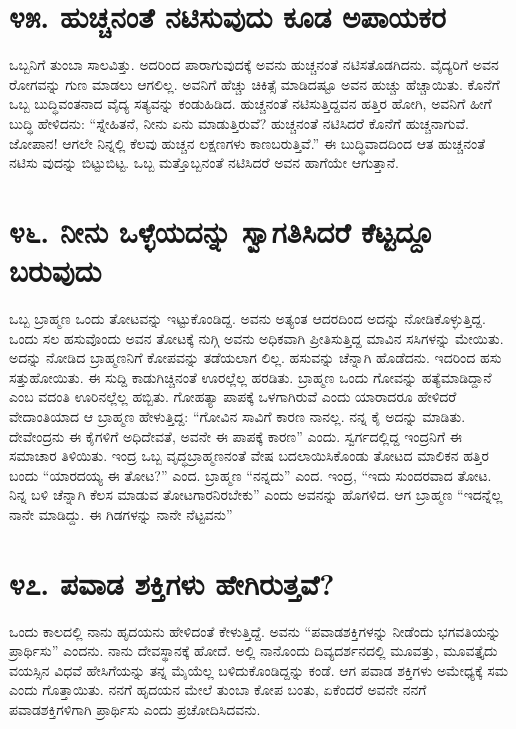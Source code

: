 \section{\num{೪೫. } ಹುಚ್ಚನಂತೆ ನಟಿಸುವುದು ಕೂಡ ಅಪಾಯಕರ}

ಒಬ್ಬನಿಗೆ ತುಂಬಾ ಸಾಲವಿತ್ತು. ಅದರಿಂದ ಪಾರಾಗುವುದಕ್ಕೆ ಅವನು ಹುಚ್ಚನಂತೆ ನಟಿಸತೊಡಗಿದನು. ವೈದ್ಯರಿಗೆ ಅವನ ರೋಗವನ್ನು ಗುಣ ಮಾಡಲು ಆಗಲಿಲ್ಲ. ಅವನಿಗೆ ಹೆಚ್ಚು ಚಿಕಿತ್ಸೆ ಮಾಡಿದಷ್ಟೂ ಅವನ ಹುಚ್ಚು ಹೆಚ್ಚಾಯಿತು. ಕೊನೆಗೆ ಒಬ್ಬ ಬುದ್ಧಿವಂತನಾದ ವೈದ್ಯ ಸತ್ಯವನ್ನು ಕಂಡುಹಿಡಿದ. ಹುಚ್ಚನಂತೆ ನಟಿಸುತ್ತಿದ್ದವನ ಹತ್ತಿರ ಹೋಗಿ, ಅವನಿಗೆ ಹೀಗೆ ಬುದ್ಧಿ ಹೇಳಿದನು: “ಸ್ನೇಹಿತನೆ, ನೀನು ಏನು ಮಾಡುತ್ತಿರುವೆ? ಹುಚ್ಚನಂತೆ ನಟಿಸಿದರೆ ಕೊನೆಗೆ ಹುಚ್ಚನಾಗುವೆ. ಜೋಪಾನ! ಆಗಲೇ ನಿನ್ನಲ್ಲಿ ಕೆಲವು ಹುಚ್ಚನ ಲಕ್ಷಣಗಳು ಕಾಣಬರುತ್ತಿವೆ.” ಈ ಬುದ್ಧಿವಾದದಿಂದ ಆತ ಹುಚ್ಚನಂತೆ ನಟಿಸು ವುದನ್ನು ಬಿಟ್ಟುಬಿಟ್ಟ. ಒಬ್ಬ ಮತ್ತೊಬ್ಬನಂತೆ ನಟಿಸಿದರೆ ಅವನ ಹಾಗೆಯೇ ಆಗುತ್ತಾನೆ.


\section{\num{೪೬. } ನೀನು ಒಳ್ಳೆಯದನ್ನು ಸ್ವಾಗತಿಸಿದರೆ ಕೆಟ್ಟದ್ದೂ ಬರುವುದು}

ಒಬ್ಬ ಬ್ರಾಹ್ಮಣ ಒಂದು ತೋಟವನ್ನು ಇಟ್ಟುಕೊಂಡಿದ್ದ. ಅವನು ಅತ್ಯಂತ ಆದರದಿಂದ ಅದನ್ನು ನೋಡಿಕೊಳ್ಳುತ್ತಿದ್ದ. ಒಂದು ಸಲ ಹಸುವೊಂದು ಅವನ ತೋಟಕ್ಕೆ ನುಗ್ಗಿ ಅವನು ಅಧಿಕವಾಗಿ ಪ್ರೀತಿಸುತ್ತಿದ್ದ ಮಾವಿನ ಸಸಿಗಳನ್ನು ಮೇಯಿತು. ಅದನ್ನು ನೋಡಿದ ಬ್ರಾಹ್ಮಣನಿಗೆ ಕೋಪವನ್ನು ತಡೆಯಲಾಗ ಲಿಲ್ಲ. ಹಸುವನ್ನು ಚೆನ್ನಾಗಿ ಹೊಡೆದನು. ಇದರಿಂದ ಹಸು ಸತ್ತುಹೋಯಿತು. ಈ ಸುದ್ದಿ ಕಾಡುಗಿಚ್ಚಿನಂತೆ ಊರಲ್ಲೆಲ್ಲ ಹರಡಿತು. ಬ್ರಾಹ್ಮಣ ಒಂದು ಗೋವನ್ನು ಹತ್ಯೆಮಾಡಿದ್ದಾನೆ ಎಂಬ ವದಂತಿ ಊರಿನಲ್ಲೆಲ್ಲ ಹಬ್ಬಿತು. ಗೋಹತ್ಯಾ ಪಾಪಕ್ಕೆ ಒಳಗಾಗಿರುವೆ ಎಂದು ಯಾರಾದರೂ ಹೇಳಿದರೆ ವೇದಾಂತಿಯಾದ ಆ ಬ್ರಾಹ್ಮಣ ಹೇಳುತ್ತಿದ್ದ: “ಗೋವಿನ ಸಾವಿಗೆ ಕಾರಣ ನಾನಲ್ಲ. ನನ್ನ ಕೈ ಅದನ್ನು ಮಾಡಿತು. ದೇವೇಂದ್ರನು ಈ ಕೈಗಳಿಗೆ ಅಧಿದೇವತೆ, ಅವನೇ ಈ ಪಾಪಕ್ಕೆ ಕಾರಣ” ಎಂದು. ಸ್ವರ್ಗದಲ್ಲಿದ್ದ ಇಂದ್ರನಿಗೆ ಈ ಸಮಾಚಾರ ತಿಳಿಯಿತು. ಇಂದ್ರ ಒಬ್ಬ ವೃದ್ಧಬ್ರಾಹ್ಮಣನಂತೆ ವೇಷ ಬದಲಾಯಿಸಿಕೊಂಡು ತೋಟದ ಮಾಲಿಕನ ಹತ್ತಿರ ಬಂದು “ಯಾರದಯ್ಯ ಈ ತೋಟ?” ಎಂದ. ಬ್ರಾಹ್ಮಣ “ನನ್ನದು” ಎಂದ. ಇಂದ್ರ, “ಇದು ಸುಂದರವಾದ ತೋಟ. ನಿನ್ನ ಬಳಿ ಚೆನ್ನಾಗಿ ಕೆಲಸ ಮಾಡುವ ತೋಟಗಾರನಿರಬೇಕು” ಎಂದು ಅವನನ್ನು ಹೊಗಳಿದ. ಆಗ ಬ್ರಾಹ್ಮಣ “ಇದನ್ನೆಲ್ಲ ನಾನೇ ಮಾಡಿದ್ದು. ಈ ಗಿಡಗಳನ್ನು ನಾನೇ ನೆಟ್ಟವನು”



\section{\num{೪೭. } ಪವಾಡ ಶಕ್ತಿಗಳು ಹೇಗಿರುತ್ತವೆ?}

ಒಂದು ಕಾಲದಲ್ಲಿ ನಾನು ಹೃದಯನು ಹೇಳಿದಂತೆ ಕೇಳುತ್ತಿದ್ದೆ. ಅವನು “ಪವಾಡಶಕ್ತಿಗಳನ್ನು ನೀಡೆಂದು ಭಗವತಿಯನ್ನು ಪ್ರಾರ್ಥಿಸು” ಎಂದನು. ನಾನು ದೇವಸ್ಥಾನಕ್ಕೆ ಹೋದೆ. ಅಲ್ಲಿ ನಾನೊಂದು ದಿವ್ಯದರ್ಶನದಲ್ಲಿ ಮೂವತ್ತು, ಮೂವತ್ತೈದು ವಯಸ್ಸಿನ ವಿಧವೆ ಹೇಸಿಗೆಯನ್ನು ತನ್ನ ಮೈಯೆಲ್ಲ ಬಳಿದುಕೊಂಡಿದ್ದನ್ನು ಕಂಡೆ. ಆಗ ಪವಾಡ ಶಕ್ತಿಗಳು ಅಮೇಧ್ಯಕ್ಕೆ ಸಮ ಎಂದು ಗೊತ್ತಾಯಿತು. ನನಗೆ ಹೃದಯನ ಮೇಲೆ ತುಂಬಾ ಕೋಪ ಬಂತು, ಏಕೆಂದರೆ ಅವನೇ ನನಗೆ ಪವಾಡಶಕ್ತಿಗಳಿಗಾಗಿ ಪ್ರಾರ್ಥಿಸು ಎಂದು ಪ್ರಚೋದಿಸಿದವನು.


